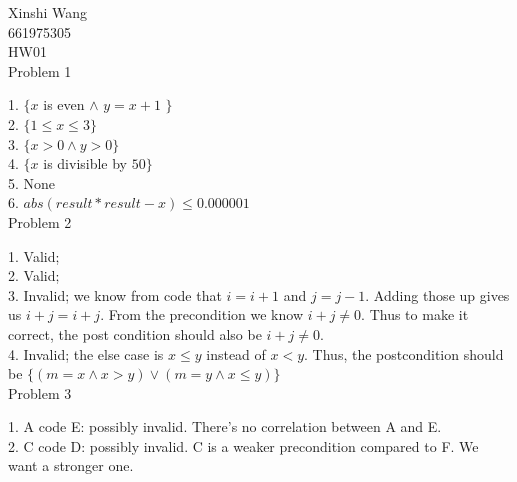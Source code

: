 \documentclass[12pt]{article}
\begin{document}
	\noindent Xinshi Wang\\
	661975305\\
	HW01\\
	
	\noindent Problem 1
	
	1. $\{ x$ is even $\land$ $y = x +1$ $\}$\\
		
	2. $\{ 1 \leq x \leq 3 \}$\\
	
	3. $\{ x > 0 \land y > 0 \}$\\
	
	4. $\{x$ is divisible by $50\}$\\
	
	5. None\\
	
	6. $abs(result*result-x)\leq 0.000001$\\
	
	\noindent Problem 2
	
	1. Valid; \\
	
	2. Valid;\\
	
	3. Invalid; we know from code that $i = i+1$ and $j = j-1$. Adding those up gives us $i+j = i+j$. From the precondition we know $i+j \neq 0$. Thus to make it correct, the post condition should also be $i+j \neq 0$.\\
	
	4. Invalid; the else case is $x \leq y$ instead of $x < y$. Thus, the postcondition should be $\{(m=x \land x>y) \lor (m = y \land x \leq y ) \} $\\
	
	\noindent Problem 3
	
	1. {A} code {E}: possibly invalid. There's no correlation between A and E.\\
	
	2. {C} code {D}: possibly invalid. C is a weaker precondition compared to F. We want a stronger one.\\
	
\end{document}
